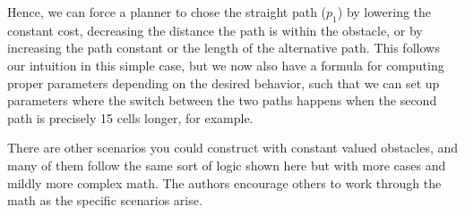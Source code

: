 Hence, we can force a planner to chose the straight path ($p_1$) by lowering the constant cost, decreasing the distance the path is within the obstacle, or by increasing the path constant or the length of the alternative path. This follows our intuition in this simple case, but we now also have a formula for computing proper parameters depending on the desired behavior, such that we can set up parameters where the switch between the two paths happens when the second path is precisely 15 cells longer, for example. 

There are other scenarios you could construct with constant valued obstacles, and many of them follow the same sort of logic shown here but with more cases and mildly more complex math. The authors encourage others to work through the math as the specific scenarios arise. 




